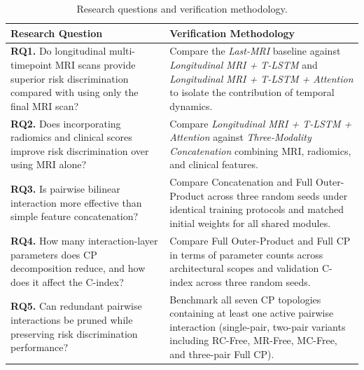 \begin{table}[H]
\centering\footnotesize
\caption[Research questions and verification methodology]{Research questions and verification methodology.}
\label{tab:rq}
\setlength{\tabcolsep}{5pt}
\renewcommand{\arraystretch}{1.02}
\begin{tabularx}{\textwidth}{@{}Y Y@{}}
\toprule
\textbf{Research Question} & \textbf{Verification Methodology} \\
\midrule
\textbf{RQ1.} Do longitudinal multi-timepoint MRI scans provide superior risk discrimination compared with using only the final MRI scan? & Compare the \textit{Last-MRI} baseline against \textit{Longitudinal MRI + T-LSTM} and \textit{Longitudinal MRI + T-LSTM + Attention} to isolate the contribution of temporal dynamics. \\
\addlinespace[2pt]
\textbf{RQ2.} Does incorporating radiomics and clinical scores improve risk discrimination over using MRI alone? & Compare \textit{Longitudinal MRI + T-LSTM + Attention} against \textit{Three-Modality Concatenation} combining MRI, radiomics, and clinical features. \\
\addlinespace[2pt]
\textbf{RQ3.} Is pairwise bilinear interaction more effective than simple feature concatenation? & Compare Concatenation and Full Outer-Product across three random seeds under identical training protocols and matched initial weights for all shared modules. \\
\addlinespace[2pt]
\textbf{RQ4.} How many interaction-layer parameters does CP decomposition reduce, and how does it affect the C-index? & Compare Full Outer-Product and Full CP in terms of parameter counts across architectural scopes and validation C-index across three random seeds. \\
\addlinespace[2pt]
\textbf{RQ5.} Can redundant pairwise interactions be pruned while preserving risk discrimination performance? & Benchmark all seven CP topologies containing at least one active pairwise interaction (single-pair, two-pair variants including RC-Free, MR-Free, MC-Free, and three-pair Full CP). \\
\bottomrule
\end{tabularx}
\end{table}

\FloatBarrier
{}
